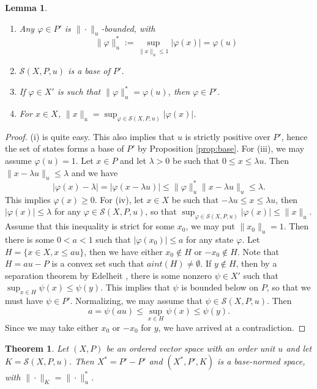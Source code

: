 \documentclass[12pt]{article}
\newtheorem{lemma}{Lemma}
\newtheorem{thm}{Theorem}
\theoremstyle{remark}
\newcommand{\<}{\langle}
\begin{document}
\begin{lemma}\label{lemma:states}
\begin{enumerate}
\item[(i)] Any $\varphi\in P'$ is $\|\cdot\|_u$-bounded, with 
\[
\|\varphi\|_u^*:=\sup_{\|x\|_u\le 1}|\varphi(x)|=\varphi(u)
\]
\item[(ii)] $\mathcal S(X,P,u)$ is a base of $P'$.
\item[(iii)] If $\varphi\in X'$ is such that $\|\varphi\|_u^*=\varphi(u)$, then $\varphi\in P'$.
\item[(iv)] For $x\in X$, $\|x\|_u=\sup_{\varphi\in \mathcal S(X,P,u)} |\varphi(x)|$.
\end{enumerate}


\end{lemma}
\begin{proof}
 (i) is quite easy. This also implies that $u$ is strictly positive over $P'$, hence the set of states forms a base of $P'$ by Proposition \ref{prop:base}. For (iii), we may assume $\varphi(u)=1$. Let $x\in P$ and let $\lambda>0$ be such that $0\le x\le \lambda u$. Then
 $\|x-\lambda u\|_u\le \lambda$ and we have
 \[
|\varphi(x)-\lambda|=|\varphi(x-\lambda u)|\le \|\varphi\|_u^*\|x-\lambda u\|_u\le \lambda.
 \]
This implies $\varphi(x)\ge 0$. For (iv), let $x\in X$ be such that  $-\lambda u\le x\le \lambda u$, then $|\varphi(x)|\le \lambda$ for any $\varphi\in \mathcal S(X,P,u)$, so that $\sup_{\varphi\in \mathcal S(X,P,u)} |\varphi(x)|\le \|x\|_u$. Assume that this inequality is strict for some $x_0$, we may put $\|x_0\|_u=1$. Then there is some $0<a<1$ such that $|\varphi(x_0)|\le a$ for any state $\varphi$. Let $H=\{x\in X, x\le au\}$, then we have either $x_0\notin H$ or $-x_0\notin H$. Note that $H=au-P$ is a convex set such that $aint(H)\ne \emptyset$. If $y\notin H$, then by a separation theorem by Edelheit \cite[0.2.4]{jameson}, there is some nonzero $\psi\in X'$ such that $\sup_{x\in H}\psi(x)\le \psi(y)$. This implies that $\psi$ is bounded below on $P$, so that we must have $\psi\in P'$. 
 Normalizing, we may assume that $\psi\in \mathcal S(X,P,u)$. Then
 \[
a=\psi(au)\le\sup_{x\in H}\psi(x)\le \psi(y).
 \]
Since we may take either $x_0$ or $-x_0$ for $y$, we have arrived at a contradiction.

\end{proof}



\begin{thm}\label{thm:ou_dual} Let $(X,P)$ be an ordered vector space with an order unit $u$ and let $K=\mathcal S(X,P,u)$.
Then $X^*=P'-P'$   and  $(X^*,P',K)$  is a base-normed space, with $\|\cdot\|_K=\|\cdot\|_u^*$. 

\end{thm}
\end{document}
